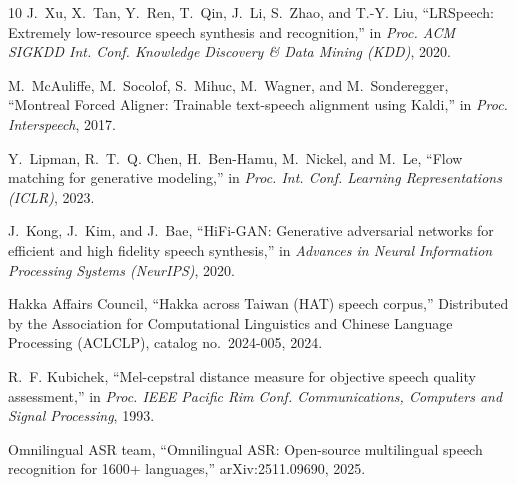 \documentclass[conference,a4paper]{IEEEtran}
\begin{document}
\begin{thebibliography}{10}
J.~Xu, X.~Tan, Y.~Ren, T.~Qin, J.~Li, S.~Zhao, and T.-Y. Liu, ``{LRSpeech}:
  Extremely low-resource speech synthesis and recognition,'' in \emph{Proc. ACM
  SIGKDD Int. Conf. Knowledge Discovery \& Data Mining (KDD)}, 2020.

M.~McAuliffe, M.~Socolof, S.~Mihuc, M.~Wagner, and M.~Sonderegger, ``{Montreal
  Forced Aligner}: Trainable text-speech alignment using {Kaldi},'' in
  \emph{Proc. Interspeech}, 2017.

Y.~Lipman, R.~T.~Q. Chen, H.~Ben-Hamu, M.~Nickel, and M.~Le, ``Flow matching
  for generative modeling,'' in \emph{Proc. Int. Conf. Learning Representations
  (ICLR)}, 2023.

J.~Kong, J.~Kim, and J.~Bae, ``{HiFi-GAN}: Generative adversarial networks for
  efficient and high fidelity speech synthesis,'' in \emph{Advances in Neural
  Information Processing Systems (NeurIPS)}, 2020.

{Hakka Affairs Council}, ``Hakka across {Taiwan} ({HAT}) speech corpus,''
  Distributed by the Association for Computational Linguistics and Chinese
  Language Processing (ACLCLP), catalog no.~2024-005, 2024.

R.~F. Kubichek, ``Mel-cepstral distance measure for objective speech quality
  assessment,'' in \emph{Proc. IEEE Pacific Rim Conf. Communications, Computers
  and Signal Processing}, 1993.

{Omnilingual ASR team}, ``Omnilingual {ASR}: Open-source multilingual speech
  recognition for 1600+ languages,'' arXiv:2511.09690, 2025.

\end{thebibliography}
\end{document}
